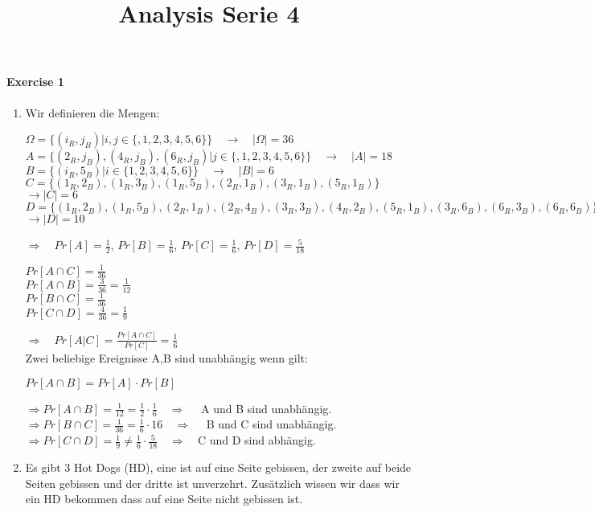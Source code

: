 \documentclass{report}
\title{Analysis Serie 4}
\begin{document}
\paragraph{Exercise 1}
\begin{enumerate}[label = \alph*)]
\item Wir definieren die Mengen:
\begin{center}
$\Omega = \{ (i_R,j_B) | i,j \in \{,1,2,3,4,5,6\}\}\quad \rightarrow \quad  |\Omega| = 36$\\
$A = \{(2_R,j_B),(4_R,j_B),(6_R,j_B)|j \in \{,1,2,3,4,5,6\}\} \quad \rightarrow \quad |A| = 18$\\
$B = \{(i_R,5_B) | i \in \{1,2,3,4,5,6\}\}\quad \rightarrow \quad |B| = 6$\\
$C = \{(1_R,2_B),(1_R,3_B),(1_R,5_B),(2_R,1_B),(3_R,1_B),(5_R,1_B)\}$ \\
$\rightarrow |C| = 6$\\
$D =  \{(1_R,2_B),(1_R,5_B),(2_R,1_B),(2_R,4_B),(3_R,3_B),(4_R,2_B),(5_R,1_B), (3_R,6_B), (6_R,3_B),(6_R,6_B)\}$ \\
$\rightarrow |D| = 10$\\
\end{center}
$\Rightarrow \quad $$Pr[A] = \frac{1}{2}$,
$Pr[B] = \frac{1}{6}$,
$Pr[C] = \frac{1}{6}$,
$Pr[D] = \frac{5}{18}$
\begin{center}
$Pr[A \cap C] = \frac{1}{36}$\\
$Pr[A \cap B] = \frac{3}{36} = \frac{1}{12}$\\
$Pr[B \cap C] = \frac{1}{36}$\\
$Pr[C \cap D] = \frac{4}{36} = \frac{1}{9}$
\end{center}
$\Rightarrow \quad Pr[A|C] = \frac{Pr[A \cap C]}{Pr[C]} = \frac{1}{6}$\\
Zwei beliebige Ereignisse A,B sind unabhängig wenn gilt:
\begin{center}
 $Pr[A \cap B] = Pr[A] \cdot Pr[B]$
\end{center}
$\Rightarrow Pr[A \cap B] = \frac{1}{12} = \frac{1}{2} \cdot \frac{1}{6} \quad \Rightarrow \quad$ A und B sind unabhängig.\\
$\Rightarrow Pr[B \cap C] = \frac{1}{36} = \frac{1}{6} \cdot {1}{6} \quad \Rightarrow \quad$ B und C sind unabhängig.\\
$\Rightarrow Pr[C \cap D] = \frac{1}{9} \neq \frac{1}{6} \cdot \frac{5}{18} \quad \Rightarrow \quad $C und D sind abhängig.
\item Es gibt 3 Hot Dogs (HD), eine ist auf eine Seite gebissen, der zweite auf beide Seiten gebissen und der dritte ist unverzehrt. Zusätzlich wissen wir dass wir ein HD bekommen dass auf eine Seite nicht gebissen ist.\\
$$
\end{enumerate}
\end{document}
